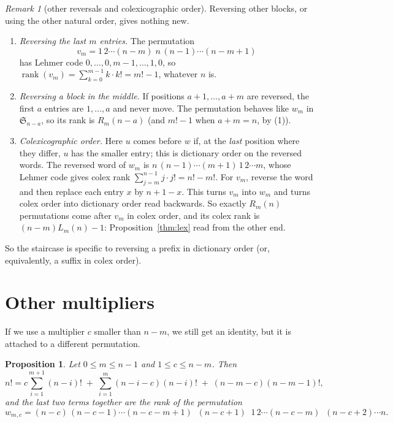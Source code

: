 \documentclass[11pt]{amsart}
\theoremstyle{plain}
\newtheorem{proposition}[theorem]{Proposition}
\theoremstyle{definition}
\theoremstyle{remark}
\newtheorem{remark}[theorem]{Remark}
\newcommand{\Sym}{\mathfrak{S}}
\newcommand{\rank}{\operatorname{rank}}
\begin{document}
\begin{remark}[other reversals and colexicographic order]\label{rem:other}
Reversing other blocks, or using the other natural order, gives nothing new.
\begin{enumerate}
  \item \emph{Reversing the last $m$ entries.} The permutation
        \[v_m=1\,2\cdots(n-m)\;n\,(n-1)\cdots(n-m+1)\]
        has Lehmer code $0,\dots,0,m-1,\dots,1,0$, so
        $\rank(v_m)=\sum_{k=0}^{m-1}k\cdot k!=m!-1$, whatever $n$ is.
  \item \emph{Reversing a block in the middle.} If positions $a+1,\dots,a+m$
        are reversed, the first $a$ entries are $1,\dots,a$ and never move.
        The permutation behaves like $w_m$ in $\Sym_{n-a}$, so its rank is
        $R_m(n-a)$ (and $m!-1$ when $a+m=n$, by (1)).
  \item \emph{Colexicographic order.} Here $u$ comes before $w$ if, at the
        \emph{last} position where they differ, $u$ has the smaller entry;
        this is dictionary order on the reversed words. The reversed word of
        $w_m$ is $n\,(n-1)\cdots(m+1)\,1\,2\cdots m$, whose Lehmer code gives
        colex rank $\sum_{j=m}^{n-1}j\cdot j!=n!-m!$. For $v_m$, reverse the
        word and then replace each entry $x$ by $n+1-x$. This turns $v_m$ into
        $w_m$ and turns colex order into dictionary order read backwards. So
        exactly $R_m(n)$ permutations come after $v_m$ in colex order, and
        its colex rank is $(n-m)L_m(n)-1$: Proposition~\ref{thm:lex} read from
        the other end.
\end{enumerate}
So the staircase is specific to reversing a prefix in dictionary order (or,
equivalently, a suffix in colex order).
\end{remark}

\section{Other multipliers}\label{sec:family}

If we use a multiplier $c$ smaller than $n-m$, we still get an identity, but
it is attached to a different permutation.

\begin{proposition}\label{thm:family}
Let $0\le m\le n-1$ and $1\le c\le n-m$. Then
\[
  n!=c\sum_{i=1}^{m+1}(n-i)!\;+\;\sum_{i=1}^{m}(n-i-c)(n-i)!\;+\;(n-m-c)(n-m-1)!,
\]
and the last two terms together are the rank of the permutation
\[
  w_{m,c}=(n-c)\,(n-c-1)\cdots(n-c-m+1)\;\;(n-c+1)\;\;
  1\,2\cdots(n-c-m)\;\;(n-c+2)\cdots n .
\]
\end{proposition}
\end{document}
